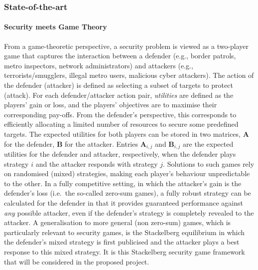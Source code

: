  

 

\subsubsection*{State-of-the-art}
\paragraph{Security meets Game Theory }
From a game-theoretic perspective, a security problem is viewed as a two-player game that captures the interaction between a defender (e.g., border patrols, metro inspectors, network administrators) and attackers (e.g., terrorists/smugglers, illegal metro users, malicious cyber attackers). The action of the defender (attacker) is defined as selecting a subset of targets to protect (attack). For each defender/attacker action pair, \textit{utilities} are defined as the players' gain or loss, and the players' objectives are to maximise their corresponding pay-offs. From the defender's perspective, this corresponds to efficiently allocating a limited number of resources to secure some predefined targets. The expected utilities for both players can be stored in two  matrices,  $\boldsymbol A$ for the defender,  $\boldsymbol B$ for the attacker. Entries $\boldsymbol A_{i,j}$ and  $\boldsymbol  B_{i,j}$  are the expected utilities for the defender and attacker, respectively, when the defender plays strategy $i$ and the attacker responds with strategy $j$.
Solutions to such games rely on randomised (mixed) strategies, making each player's behaviour unpredictable to the other.  In a fully competitive setting, in which the attacker's gain is the defender's loss (i.e.\ the so-called zero-sum games), a fully robust strategy can be calculated for the defender in that it provides guaranteed performance against {\em any} possible attacker, even if the defender's strategy is completely revealed to the attacker.  
A generalisation to more general (non zero-sum) games, which is particularly relevant to security games, is the Stackelberg equilibrium\cite{korzhyk2011stackelberg} in which the defender's mixed strategy is first publicised and the attacker plays a best response to this mixed strategy.
It is this Stackelberg security game framework that will be considered in the proposed project.

